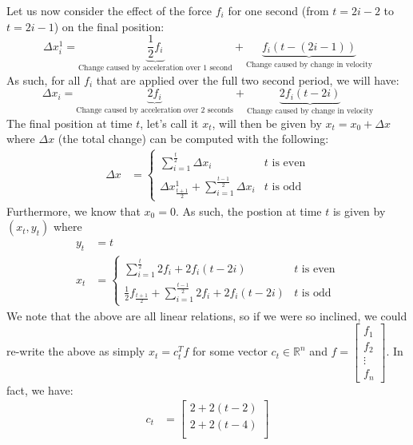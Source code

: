 \documentclass[12pt]{exam}
\begin{document}
\begin{questions}
\begin{solution}
\begin{enumerate}[label=(\alph*)]
      Let us now consider the effect of the force $f_i$ for one second (from $t = 2i -2$ to $t = 2i - 1$) on the final position:
      \[
        \Delta x_i^1 = \underbrace{\frac{1}{2}f_i}_{\text{Change caused by acceleration over 1 second}} + \underbrace{f_i(t - (2i - 1))}_{\text{Change caused by change in velocity}}
      \]
      As such, for all $f_i$ that are applied over the full two second period, we will have:
      \[
        \Delta x_i = \underbrace{2f_i}_{\text{Change caused by acceleration over 2 seconds}} + \underbrace{2f_i(t - 2i)}_{\text{Change caused by change in velocity}}
      \]
    The final position at time $t$, let's call it $x_t$, will then be given by $x_t = x_0 + \Delta x$ where $\Delta x$ (the total change) can be computed with the following:
    \begin{align*}
      \Delta x &= 
        \begin{cases}
          \sum_{i=1}^{\frac{t}{2} } \Delta x_i  & t \text{ is even} \\
          \Delta x_{\frac{t+1}{2}}^1 + \sum_{i=1}^{\frac{t-1}{2} } \Delta x_i & t \text{ is odd}
        \end{cases}
    \end{align*}
    Furthermore, we know that $x_0 = 0$. As such, the postion at time $t$ is given by $(x_t, y_t)$ where 
    \begin{align*}
      y_t &= t \\
      x_t &=
        \begin{cases}
          \sum_{i=1}^{\frac{t}{2}} 2f_i + 2f_i(t - 2i) & t \text{ is even} \\
          \frac{1}{2}f_{\frac{t+1}{2}} + \sum_{i=1}^{\frac{t-1}{2}} 2f_i + 2f_i(t - 2i) & t \text{ is odd}
        \end{cases}
    \end{align*}
    We note that the above are all linear relations, so if we were so inclined, we could re-write the above as simply $x_t = c_t^T f$ for some vector $c_t \in \mathbb{R}^{n}$ and $f = \begin{bmatrix} f_1 \\ f_2 \\ \vdots\\ f_n \end{bmatrix}$. In fact, we have:
    \begin{align*}
      c_t &=
        \begin{bmatrix}
          2 + 2(t -2) \\
          2 + 2(t - 4) \\

\end{bmatrix}
\end{align*}
\end{enumerate}
\end{solution}
\end{questions}
\end{document}
